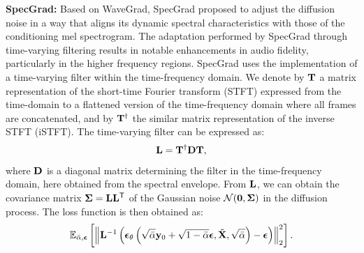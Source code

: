 \textbf{SpecGrad:} Based on WaveGrad, SpecGrad \cite{koizumi2022specgrad} proposed to adjust the diffusion noise in a way that aligns its dynamic spectral characteristics with those of the conditioning mel spectrogram. The adaptation performed by SpecGrad through time-varying filtering results in notable enhancements in audio fidelity, particularly in the higher frequency regions. SpecGrad uses the implementation of a time-varying filter within the time-frequency domain.
We denote by $\mathbf{T}$ a matrix representation of the short-time Fourier transform (STFT) expressed from the time-domain to a flattened version of the time-frequency domain where all frames are concatenated, and by $\mathbf{T}^{\dagger}$ the similar matrix representation of the inverse STFT (iSTFT).
The time-varying filter can be expressed as: 
\begin{equation}
    \mathbf{L}=\mathbf{T}^{\dagger} \mathbf{D} \mathbf{T},
\end{equation}
where $\mathbf{D}$ is a diagonal matrix determining the filter in the time-frequency domain, here obtained from the spectral envelope.
From $\mathbf{L}$, we can obtain the covariance matrix $\boldsymbol{\Sigma}=\mathbf{L}\mathbf{L}^{\mathsf{T}}$ of the Gaussian noise 
$\mathcal{N}(\mathbf{0},\boldsymbol{\Sigma})$ in the diffusion process.
The loss function is then obtained as:
\begin{equation}
    \mathbb{E}_{\bar{\alpha}, \boldsymbol{\epsilon}}
    \left[
    \left\|\mathbf{L}^{-1}\left(\boldsymbol{\epsilon}_\theta\left(\sqrt{\bar{\alpha}} \mathbf{y}_0+\sqrt{1-\bar{\alpha}} \boldsymbol{\epsilon}, \tilde{\mathbf{X}}, \sqrt{\bar{\alpha}}\right)-\boldsymbol{\epsilon} \right)\right\|_2^2\right]. \\
\end{equation}